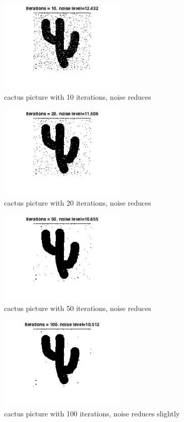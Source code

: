 \documentclass[twoside]{article}
\theoremstyle{definition}
\theoremstyle{definition}
\theoremstyle{remark}
\begin{document}
\begin{figure}[H]
\centering
\includegraphics[width=60mm]{10_cactus.jpg}
\caption{cactus picture with 10 iterations, noise reduces}
\end{figure}

\begin{figure}[H]
\centering
\includegraphics[width=60mm]{20_cactus.jpg}
\caption{cactus picture with 20 iterations, noise reduces}
\end{figure}

\begin{figure}[H]
\centering
\includegraphics[width=60mm]{50_cactus.jpg}
\caption{cactus picture with 50 iterations, noise reduces}
\end{figure}

\begin{figure}[H]
\centering
\includegraphics[width=60mm]{100_cactus.jpg}
\caption{cactus picture with 100 iterations, noise reduces slightly}
\end{figure}
\end{document}
